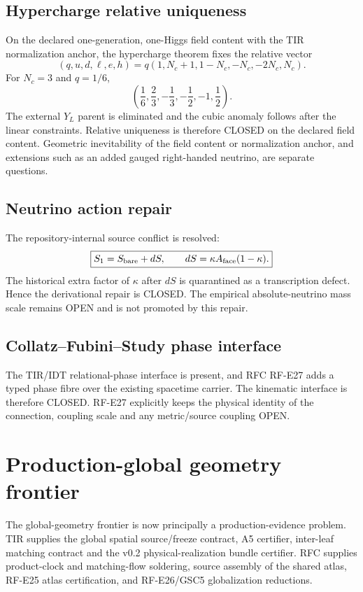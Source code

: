\subsection{Hypercharge relative uniqueness}

On the declared one-generation, one-Higgs field content with the TIR
normalization anchor, the hypercharge theorem fixes the relative vector
\[
(q,u,d,\ell,e,h)
=q(1,N_c+1,1-N_c,-N_c,-2N_c,N_c).
\]
For \(N_c=3\) and \(q=1/6\),
\[
\boxed{
\left(\frac16,\frac23,-\frac13,-\frac12,-1,\frac12\right).
}
\]
The external \(Y_L\) parent is eliminated and the cubic anomaly follows after
the linear constraints. Relative uniqueness is therefore CLOSED on the declared
field content. Geometric inevitability of the field content or normalization
anchor, and extensions such as an added gauged right-handed neutrino, are
separate questions.

\subsection{Neutrino action repair}

The repository-internal source conflict is resolved:
\[
\boxed{
S_1=S_{\rm bare}+dS,
\qquad
dS=\kappa A_{\rm face}(1-\kappa).
}
\]
The historical extra factor of \(\kappa\) after \(dS\) is quarantined as a
transcription defect. Hence the derivational repair is CLOSED. The empirical
absolute-neutrino mass scale remains OPEN and is not promoted by this repair.

\subsection{Collatz--Fubini--Study phase interface}

The TIR/IDT relational-phase interface is present, and RFC RF-E27 adds a typed
phase fibre over the existing spacetime carrier. The kinematic interface is
therefore CLOSED. RF-E27 explicitly keeps the physical identity of the
connection, coupling scale and any metric/source coupling OPEN.

\section{Production-global geometry frontier}

The global-geometry frontier is now principally a production-evidence problem.
TIR supplies the global spatial source/freeze contract, A5 certifier,
inter-leaf matching contract and the v0.2 physical-realization bundle
certifier. RFC supplies product-clock and matching-flow soldering, source
assembly of the shared atlas, RF-E25 atlas certification, and RF-E26/GSC5
globalization reductions.

